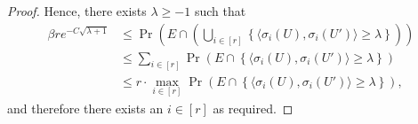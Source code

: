 \begin{proof}
  Hence, there exists \(\lambda \ge -1\) such that
  \begin{align}\label{eq:max:big:and:E}
    \beta r e^{-C\sqrt{\lambda + 1}} &\le \Pr\left(E \cap \left( \bigcup_{i \in [r]} \left\{ \big\langle \sigma_i(U),\sigma_i(U') \big\rangle \ge \lambda \right\}\right)   \right) \\
    &\le \sum_{i \in [r]} \Pr\left(E \cap \left\{ \big\langle \sigma_i(U),\sigma_i(U') \big\rangle \ge \lambda \right\} \right)\\
    &\le r \cdot \max_{i \in [r]} \Pr\left(E \cap \left\{ \big\langle \sigma_i(U),\sigma_i(U') \big\rangle \ge \lambda \right\} \right) ,
  \end{align}
  and therefore there exists an \(i \in [r]\) as required.
\end{proof}